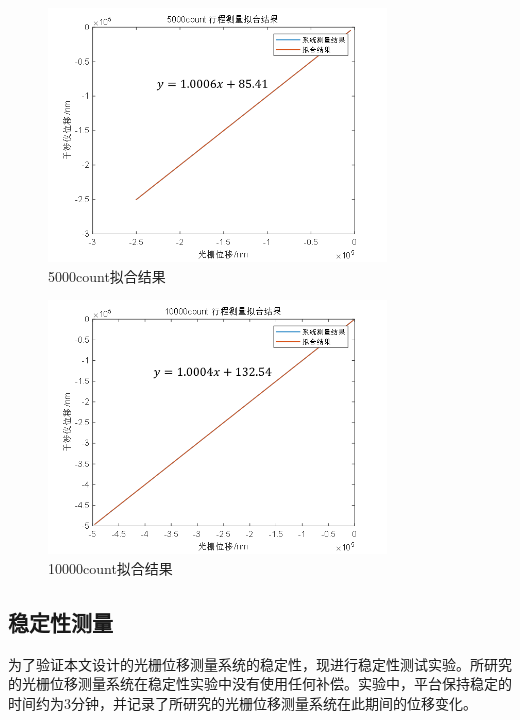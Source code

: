 \documentclass[type=master,oneside]{fduthesis}
\begin{document}
\begin{figure}[H]
  \centering
  \includegraphics[width=0.8\textwidth]{4-fig//5000count拟合结果.png}
  \caption{5000count拟合结果}
  \label{fig:5000count拟合结果}
\end{figure}
\begin{figure}[H]
  \centering
  \includegraphics[width=0.8\textwidth]{4-fig//10000count拟合结果.png}
  \caption{10000count拟合结果}
  \label{fig:10000count拟合结果}
\end{figure}

\subsection{稳定性测量}
为了验证本文设计的光栅位移测量系统的稳定性，现进行稳定性测试实验。所研究的光栅位移测量系统在稳定性实验中没有使用任何补偿。实验中，平台保持稳定的时间约为3分钟，并记录了所研究的光栅位移测量系统在此期间的位移变化。
\end{document}

